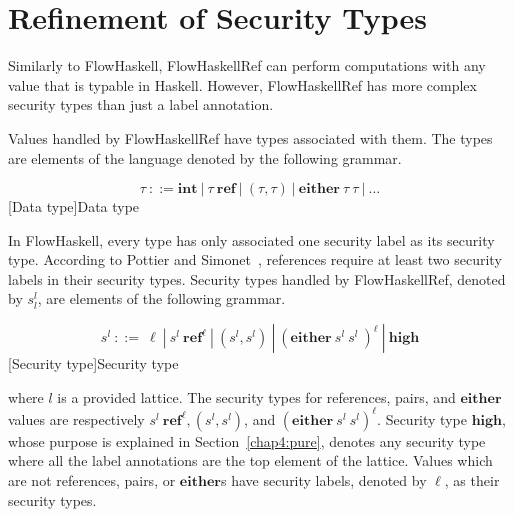 \documentclass[a4paper]{report}
\newcommand{\sts}[1]{s_{#1}^l}
\newcommand{\st}{s^l}
\newcommand{\typ}{\tau}
\begin{document}
\section{Refinement of Security Types}

\label{chap4:CSL}



Similarly to FlowHaskell,  FlowHaskellRef can perform computations
with any value that is typable in Haskell. However, FlowHaskellRef has more complex security types than
just a label annotation.

Values handled by FlowHaskellRef have types associated with them. The
types are elements of the language denoted by the following grammar.

\begin{equation*}
\typ\ ::= \mathbf{int} \ | \ \typ\ \mathbf{ref}\ |\ (\typ,\typ)\ |\
\mathbf{either}\ \typ\ \typ \ | \ \dots 
\end{equation*} 
[Data type]{Data type} 
\label{fig:types} 

In FlowHaskell, every type has only associated one security label as
its security type. According to Pottier and Simonet~\cite{Pottier:Simonet:POPL02}, 
references require at least two security labels in their security
types. Security types handled by FlowHaskellRef, denoted by $\sts{l}$, are 
elements of the following grammar.

\begin{equation*}
\st\ ::=\ \ell\ |\ \st\ {\mathbf{ref}}^{\ell}\ |\ (\st,\st)\ |\ ({\mathbf{either}}\ \st\ \st\ )^{\ell}\ |\ {\mathbf{high}}
\end{equation*} 
[Security type]{Security type} 
\label{fig:cst} 

where $l$ is a provided lattice. The security types for references,
pairs, and $\mathbf{either}$ values are respectively  
$\st\ {\mathbf{ref}}^{\ell},(\st,\st)$, and 
$({\mathbf{either}}\ \st\ \st)^{\ell}$. Security type $\mathbf{high}$, 
whose purpose is explained in Section~\ref{chap4:pure}, denotes
any security type where all the label annotations are the top element
of the lattice. Values which are not references, pairs,
or $\mathbf{either}$s have security labels, denoted by $\ell$, as
their security types. 
\end{document}
